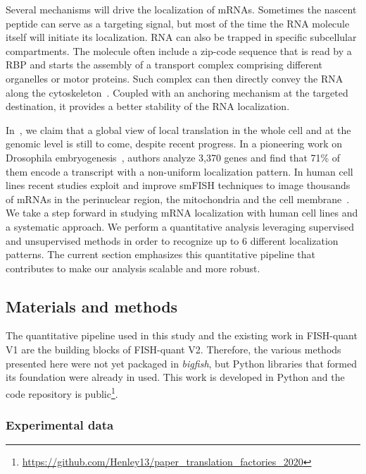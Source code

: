 Several mechanisms will drive the localization of \ac{mRNA}s.
Sometimes the nascent peptide can serve as a targeting signal, but most of the time the \ac{RNA} molecule itself will initiate its localization.
\ac{RNA} can also be trapped in specific subcellular compartments.
The molecule often include a zip-code sequence that is read by a \ac{RBP} and starts the assembly of a transport complex comprising different organelles or motor proteins.
Such complex can then directly convey the \ac{RNA} along the cytoskeleton~\cite{Blower_2013}.
Coupled with an anchoring mechanism at the targeted destination, it provides a better stability of the \ac{RNA} localization.

In~\cite{CHOUAIB_2020}, we claim that a global view of local translation in the whole cell and at the genomic level is still to come, despite recent progress.
In a pioneering work on Drosophila embryogenesis~\cite{lecuyer_global_2007}, authors analyze 3,370 genes and find that 71\% of them encode a transcript with a non-uniform localization pattern.
In human cell lines recent studies exploit and improve \ac{smFISH} techniques to image thousands of \ac{mRNA}s in the perinuclear region, the mitochondria and the cell membrane~\cite{battich_image-based_2013, Chen_2015, eng_seqfish_2019, Xia_2019}.
We take a step forward in studying \ac{mRNA} localization with human cell lines and a systematic approach.
We perform a quantitative analysis leveraging supervised and unsupervised methods in order to recognize up to 6 different localization patterns.
The current section emphasizes this quantitative pipeline that contributes to make our analysis scalable and more robust.

\subsection{Materials and methods}
\label{subsec:materials_general_pattern}

The quantitative pipeline used in this study and the existing work in FISH-quant V1 are the building blocks of FISH-quant V2.
Therefore, the various methods presented here were not yet packaged in \emph{bigfish}, but Python libraries that formed its foundation were already in used.
This work is developed in Python and the code repository is public\footnote{\url{https://github.com/Henley13/paper_translation_factories_2020}}.

\subsubsection{Experimental data}

